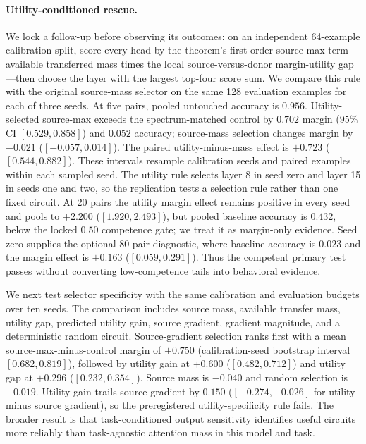 \documentclass[letterpaper]{article} %
\begin{document}
\paragraph{Utility-conditioned rescue.}
We lock a follow-up before observing its outcomes: on an independent 64-example calibration split, score
every head by the theorem's first-order source-max term---available transferred mass times the local
source-versus-donor margin-utility gap---then choose the layer with the largest top-four score sum. We
compare this rule with the original source-mass selector on the same 128 evaluation examples for each of
three seeds. At five pairs, pooled untouched accuracy is $0.956$. Utility-selected source-max exceeds the
spectrum-matched control by $0.702$ margin ($95\%$ CI $[0.529,0.858]$) and $0.052$ accuracy;
source-mass selection changes margin by $-0.021$ ($[-0.057,0.014]$). The paired
utility-minus-mass effect is $+0.723$ ($[0.544,0.882]$). These intervals resample calibration seeds and
paired examples within each sampled seed. The utility rule selects layer 8 in seed zero and
layer 15 in seeds one and two, so the replication tests a selection rule rather than one fixed circuit.
At 20 pairs the utility margin effect remains positive in every seed and pools to $+2.200$
($[1.920,2.493]$), but pooled baseline accuracy is $0.432$, below the locked $0.50$ competence gate; we
treat it as margin-only evidence. Seed zero supplies the optional 80-pair diagnostic, where baseline
accuracy is $0.023$ and the margin effect is $+0.163$ ($[0.059,0.291]$). Thus the competent primary test
passes without converting low-competence tails into behavioral evidence.

We next test selector specificity with the same calibration and evaluation budgets over ten seeds.
The comparison includes source mass, available transfer mass, utility gap, predicted utility gain,
source gradient, gradient magnitude, and a deterministic random circuit.
Source-gradient selection ranks first with a mean source-max-minus-control margin of $+0.750$
(calibration-seed bootstrap interval $[0.682,0.819]$), followed by utility gain at $+0.600$
($[0.482,0.712]$) and utility gap at $+0.296$ ($[0.232,0.354]$).
Source mass is $-0.040$ and random selection is $-0.019$.
Utility gain trails source gradient by $0.150$ ($[-0.274,-0.026]$ for utility minus source gradient), so
the preregistered utility-specificity rule fails.
The broader result is that task-conditioned output sensitivity identifies useful circuits more reliably
than task-agnostic attention mass in this model and task.
\end{document}
